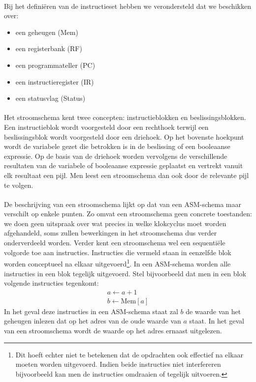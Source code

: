 \paragraph{}
Bij het defini\"eren van de instructieset hebben we verondersteld dat we beschikken over:
\begin{itemize}
 \item een geheugen (Mem)
 \item een registerbank (RF)
 \item een programmateller (PC)
 \item een instructieregister (IR)
 \item een statusvlag (Status)
\end{itemize}
\paragraph{}
Het stroomschema kent twee concepten: instructieblokken en beslissingsblokken. Een instructieblok wordt voorgesteld door een rechthoek terwijl een beslissingsblok wordt voorgesteld door een driehoek. Op het bovenste hoekpunt wordt de variabele gezet die betrokken is in de beslissing of een booleaanse expressie. Op de basis van de driehoek worden vervolgens de verschillende resultaten van de variabele of booleaanse expressie geplaatst en vertrekt vanuit elk resultaat een pijl. Men leest een stroomschema dan ook door de relevante pijl te volgen.
\paragraph{}
De beschrijving van een stroomschema lijkt op dat van een ASM-schema maar verschilt op enkele punten. Zo omvat een stroomschema geen concrete toestanden: we doen geen uitspraak over wat precies in welke klokcyclus moet worden afgehandeld, soms zullen bewerkingen in het stroomschema dus verder onderverdeeld worden. Verder kent een stroomschema wel een sequenti\"ele volgorde toe aan instructies. Instructies die vermeld staan in eenzelfde blok worden conceptueel na elkaar uitgevoerd\footnote{Dit hoeft echter niet te betekenen dat de opdrachten ook effectief na elkaar moeten worden uitgevoerd. Indien beide instructies niet interfereren bijvoorbeeld kan men de instructies omdraaien of tegelijk uitvoeren.}. In een ASM-schema worden alle instructies in een blok tegelijk uitgevoerd. Stel bijvoorbeeld dat men in een blok volgende instructies tegenkomt:
\begin{equation}
\begin{array}{l}
a\leftarrow a+1\\
b\leftarrow\mbox{Mem}[a]
\end{array}
\end{equation}
In het geval deze instructies in een ASM-schema staat zal $b$ de waarde van het geheugen inlezen dat op het adres van de oude waarde van $a$ staat. In het geval van een stroomschema wordt de waarde op het adres ernaast uitgelezen.
